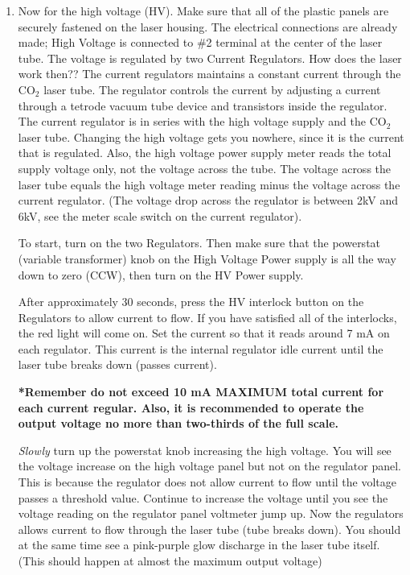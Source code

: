 \documentclass{../lab}
\begin{document}
\begin{enumerate}
    \item Now for the high voltage (HV). Make sure that all of the plastic panels are securely fastened on the laser housing. The electrical connections are already made; High Voltage is connected to \#2 terminal at the center of the laser tube. The voltage is regulated by two Current Regulators. How does the laser work then?? The current regulators maintains a constant current through the CO$_2$ laser tube. The regulator controls the current by adjusting a current through a tetrode vacuum tube device and transistors inside the regulator. The current regulator is in series with the high voltage supply and the CO$_2$ laser tube. Changing the high voltage gets you nowhere, since it is the current that is regulated. Also, the high voltage power supply meter reads the total supply voltage only, not the voltage across the tube. The voltage across the laser tube equals the high voltage meter reading minus the voltage across the current regulator. (The voltage drop across the regulator is between 2kV and 6kV, see the meter scale switch on the current regulator).
    
    To start, turn on the two Regulators. Then make sure that the powerstat (variable transformer) knob on the High Voltage Power supply is all the way down to zero (CCW), then turn on the HV Power supply.
    
    After approximately 30 seconds, press the HV interlock button on the Regulators to allow current to flow. If you have satisfied all of the interlocks, the red light will come on. Set the current so that it reads around 7 mA on each regulator. This current is the internal regulator idle current until the laser tube breaks down (passes current).
    
    \textbf{*Remember do not exceed 10 mA MAXIMUM total current for each current regular. Also, it is recommended to operate the output voltage no more than two-thirds of the full scale.}
    
    \emph{Slowly} turn up the powerstat knob increasing the high voltage. You will see the voltage increase on the high voltage panel but not on the regulator panel. This is because the regulator does not allow current to flow until the voltage passes a threshold value. Continue to increase the voltage until you see the voltage reading on the regulator panel voltmeter jump up. Now the regulators allows current to flow through the laser tube (tube breaks down). You should at the same time see a pink-purple glow discharge in the laser tube itself. (This should happen at almost the maximum output voltage)


\end{enumerate}
\end{document}
